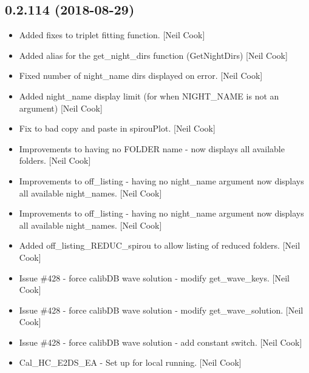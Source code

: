 \documentclass[a4paper,10pt,english]{report}
\begin{document}
\subsection{0.2.114 (2018-08-29)}
\label{\detokenize{misc/changelog:id344}}\begin{itemize}
\item {} 
Added fixes to triplet fitting function. {[}Neil Cook{]}

\item {} 
Added alias for the get\_night\_dirs function (GetNightDirs) {[}Neil Cook{]}

\item {} 
Fixed number of night\_name dirs displayed on error. {[}Neil Cook{]}

\item {} 
Added night\_name display limit (for when NIGHT\_NAME is not an
argument) {[}Neil Cook{]}

\item {} 
Fix to bad copy and paste in spirouPlot. {[}Neil Cook{]}

\item {} 
Improvements to having no FOLDER name - now displays all available
folders. {[}Neil Cook{]}

\item {} 
Improvements to off\_listing - having no night\_name argument now
displays all available night\_names. {[}Neil Cook{]}

\item {} 
Improvements to off\_listing - having no night\_name argument now
displays all available night\_names. {[}Neil Cook{]}

\item {} 
Added off\_listing\_REDUC\_spirou to allow listing of reduced folders.
{[}Neil Cook{]}

\item {} 
Issue \#428 - force calibDB wave solution - modify get\_wave\_keys. {[}Neil
Cook{]}

\item {} 
Issue \#428 - force calibDB wave solution - modify get\_wave\_solution.
{[}Neil Cook{]}

\item {} 
Issue \#428 - force calibDB wave solution - add constant switch. {[}Neil
Cook{]}

\item {} 
Cal\_HC\_E2DS\_EA - Set up for local running. {[}Neil Cook{]}

\end{itemize}
\end{document}
